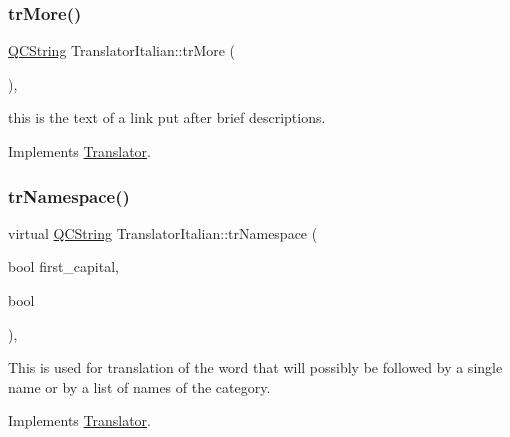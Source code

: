 \mbox{\label{class_translator_italian_a4aea4630e1a34c3df9e8d586662ae018}} 
\subsubsection{\texorpdfstring{trMore()}{trMore()}}
{\footnotesize\ttfamily \mbox{\hyperlink{class_q_c_string}{Q\+C\+String}} Translator\+Italian\+::tr\+More (\begin{DoxyParamCaption}{ }\end{DoxyParamCaption})\hspace{0.3cm}{\ttfamily [inline]}, {\ttfamily [virtual]}}

this is the text of a link put after brief descriptions. 

Implements \mbox{\hyperlink{class_translator}{Translator}}.

\mbox{\label{class_translator_italian_adb8ad11a5f174e4540487bad78e4ca31}} 
\subsubsection{\texorpdfstring{trNamespace()}{trNamespace()}}
{\footnotesize\ttfamily virtual \mbox{\hyperlink{class_q_c_string}{Q\+C\+String}} Translator\+Italian\+::tr\+Namespace (\begin{DoxyParamCaption}\item[{bool}]{first\+\_\+capital,  }\item[{bool}]{ }\end{DoxyParamCaption})\hspace{0.3cm}{\ttfamily [inline]}, {\ttfamily [virtual]}}

This is used for translation of the word that will possibly be followed by a single name or by a list of names of the category. 

Implements \mbox{\hyperlink{class_translator}{Translator}}.

\mbox{\label{class_translator_italian_a6f3cfb6281fe8057aeabc4afd79a9067}} 
